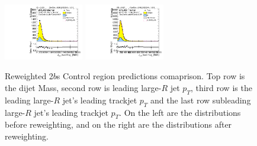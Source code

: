 \begin{figure}[htbp!]
\begin{center}
\includegraphics[angle=270, width=0.31\textwidth]{./figures/boosted/Prereweight/Moriond_TwoTag_split_Control_sublHCand_trk0_Pt.pdf}
\includegraphics[angle=270, width=0.31\textwidth]{./figures/boosted/Control/b77_TwoTag_split_Control_sublHCand_trk0_Pt.pdf}\\
\caption{Reweighted 2$b$s Control region predictions comaprison. Top row is the dijet Mass, second row is leading large-$R$ jet $p_{T}$, third row is the leading large-$R$ jet's leading trackjet $p_T$ and the last row subleading large-$R$ jet's leading trackjet $p_T$. On the left are the distributions before reweighting, and on the right are the distributions after reweighting.}
\label{fig:rw-2bs-comp-cr}
\end{center}
\end{figure}



